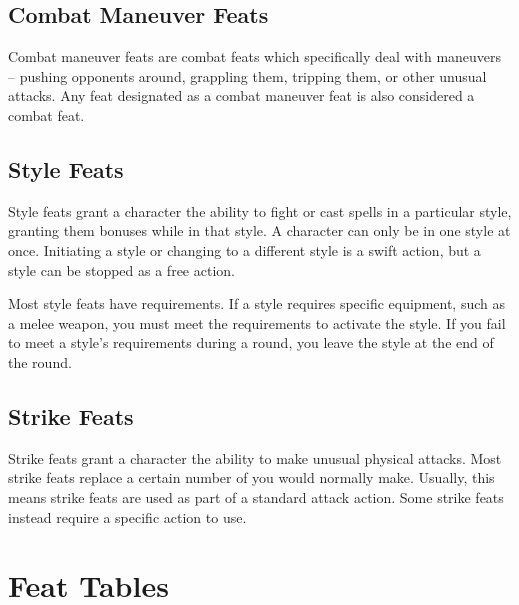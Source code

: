 \subsection{Combat Maneuver Feats}
Combat maneuver feats are combat feats which specifically deal with maneuvers -- pushing opponents around, grappling them, tripping them, or other unusual attacks.
Any feat designated as a combat maneuver feat is also considered a combat feat.

\subsection{Style Feats}
Style feats grant a character the ability to fight or cast spells in a particular style, granting them bonuses while in that style.
A character can only be in one style at once.
Initiating a style or changing to a different style is a swift action, but a style can be stopped as a free action.

Most style feats have requirements.
If a style requires specific equipment, such as a melee weapon, you must meet the requirements to activate the style.
If you fail to meet a style's requirements during a round, you leave the style at the end of the round.

\subsection{Strike Feats}\label{Strike Feats}
Strike feats grant a character the ability to make unusual physical attacks.
Most strike feats replace a certain number of  you would normally make.
Usually, this means strike feats are used as part of a standard attack action.
Some strike feats instead require a specific action to use.

\section{Feat Tables}
\onecolumn

